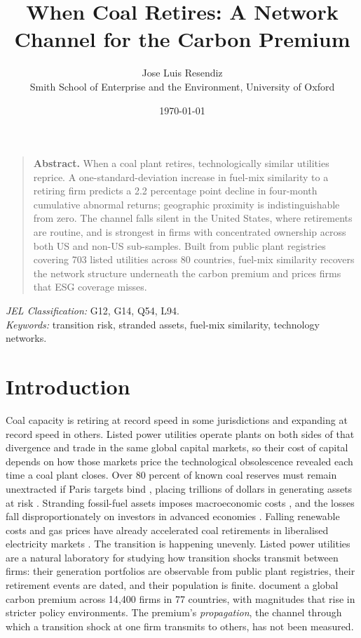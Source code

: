 \documentclass[12pt,a4paper]{article}
\title{\large\textbf{When Coal Retires: A Network Channel for the Carbon Premium}\vspace{-0.5em}}
\author{\normalsize Jose Luis Resendiz\\[4pt] \small Smith School of Enterprise and the Environment, University of Oxford}
\date{\small\today}
\begin{document}
{\singlespacing\maketitle}

\begin{quotation}\small\singlespacing\noindent
\textbf{Abstract.} When a coal plant retires, technologically similar utilities reprice. A one-standard-deviation increase in fuel-mix similarity to a retiring firm predicts a 2.2 percentage point decline in four-month cumulative abnormal returns; geographic proximity is indistinguishable from zero. The channel falls silent in the United States, where retirements are routine, and is strongest in firms with concentrated ownership across both US and non-US sub-samples. Built from public plant registries covering 703 listed utilities across 80 countries, fuel-mix similarity recovers the network structure underneath the carbon premium and prices firms that ESG coverage misses.
\end{quotation}

\medskip\noindent\textit{JEL Classification:} G12, G14, Q54, L94.\\
\noindent\textit{Keywords:} transition risk, stranded assets, fuel-mix similarity, technology networks.

\section{Introduction}\label{sec:intro}

Coal capacity is retiring at record speed in some jurisdictions and expanding at record speed in others. Listed power utilities operate plants on both sides of that divergence and trade in the same global capital markets, so their cost of capital depends on how those markets price the technological obsolescence revealed each time a coal plant closes. Over 80 percent of known coal reserves must remain unextracted if Paris targets bind \citep{McGlade2015}, placing trillions of dollars in generating assets at risk \citep{Dietz2016}. Stranding fossil-fuel assets imposes macroeconomic costs \citep{MercurePollittVinualesEdwards2018}, and the losses fall disproportionately on investors in advanced economies \citep{SemieniukHoldenMercureSalas2022}. Falling renewable costs and gas prices have already accelerated coal retirements in liberalised electricity markets \citep{FellKaffine2018}. The transition is happening unevenly. Listed power utilities are a natural laboratory for studying how transition shocks transmit between firms: their generation portfolios are observable from public plant registries, their retirement events are dated, and their population is finite. \citet{BoltonKacperczyk2023} document a global carbon premium across 14{,}400 firms in 77 countries, with magnitudes that rise in stricter policy environments. The premium's \emph{propagation}, the channel through which a transition shock at one firm transmits to others, has not been measured.
\end{document}
